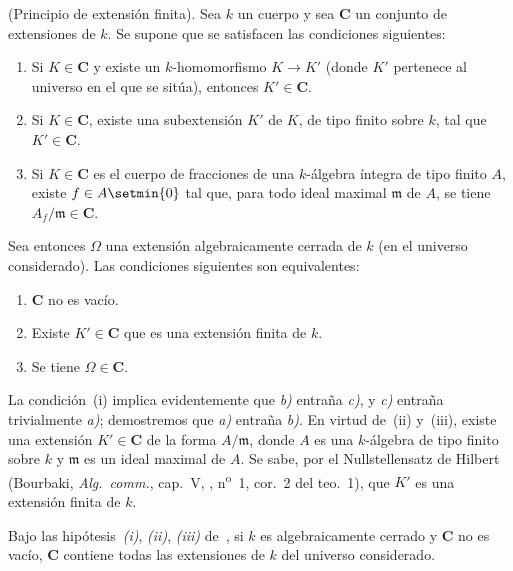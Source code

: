 \begin{proposition}[9.1.1]
\label{IV.9.1.1}
\textnormal{(Principio de extensión finita).}
Sea $k$ un cuerpo y sea $\boldsymbol{C}$ un conjunto de extensiones de $k$.
Se supone que se satisfacen las condiciones siguientes:
\begin{enumerate}[label=\textup{(\roman*)}]
  \item Si $K\in\boldsymbol{C}$ y existe un $k$-homomorfismo $K\to K'$ (donde $K'$ pertenece al universo en el que se sitúa), entonces $K'\in\boldsymbol{C}$.
  \item Si $K\in\boldsymbol{C}$, existe una subextensión $K'$ de $K$, de tipo finito sobre $k$, tal que $K'\in\boldsymbol{C}$.
  \item Si $K\in\boldsymbol{C}$ es el cuerpo de fracciones de una $k$-álgebra íntegra de tipo finito $A$, existe $f\in A\setmin\{0\}$ tal que, para todo ideal maximal $\mathfrak m$ de $A$, se tiene $A_f/\mathfrak m\in\boldsymbol{C}$.
\end{enumerate}


Sea entonces $\Omega$ una extensión algebraicamente cerrada de $k$ (en el universo considerado).
Las condiciones siguientes son equivalentes:
\begin{enumerate}[label=\emph{\alph*)}]
  \item $\boldsymbol{C}$ no es vacío.
  \item Existe $K'\in\boldsymbol{C}$ que es una extensión \textup{finita} de $k$.
  \item Se tiene $\Omega\in\boldsymbol{C}$.
\end{enumerate}
\end{proposition}

La condición~(i) implica evidentemente que \emph{b)} entraña \emph{c)}, y \emph{c)} entraña trivialmente \emph{a)};
demostremos que \emph{a)} entraña \emph{b)}.
En virtud de~(ii) y~(iii), existe una extensión $K'\in\boldsymbol{C}$ de la forma $A/\mathfrak m$, donde $A$ es una $k$-álgebra de tipo finito sobre $k$ y $\mathfrak m$ es un ideal maximal de $A$.
Se sabe, por el Nullstellensatz de Hilbert (Bourbaki, \emph{Alg.\ comm.}, cap.~V, , n\textsuperscript{o}~1, cor.~2 del teo.~1), que $K'$ es una extensión finita de $k$.

\begin{corollary}[9.1.2]
\label{IV.9.1.2}
Bajo las hipótesis~\emph{(i)}, \emph{(ii)}, \emph{(iii)} de~, si $k$ es algebraicamente cerrado y $\boldsymbol{C}$ no es vacío, $\boldsymbol{C}$ contiene todas las extensiones de $k$ del universo considerado.
\end{corollary}

